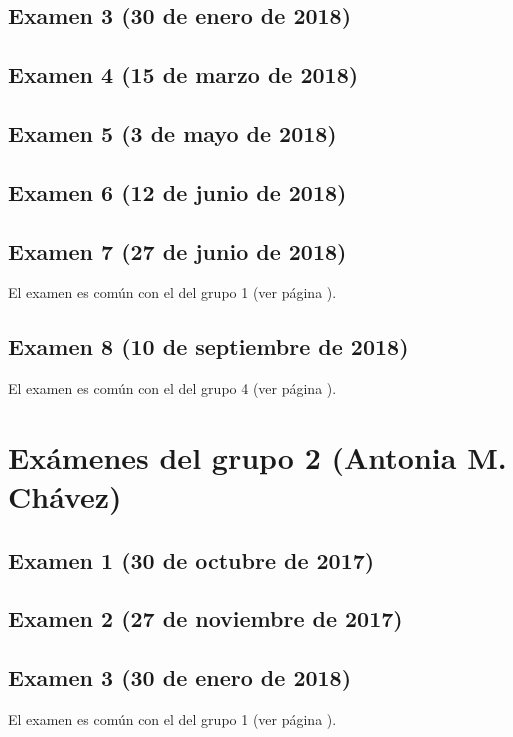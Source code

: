\documentclass[a4paper,12pt,twoside]{book}
\begin{document}
\subsection{Examen 3 (30 de enero de 2018)}
 \label{examen_17_18_1_3}
\subsection{Examen 4 (15 de marzo de 2018)}
\subsection{Examen 5 (3 de mayo de 2018)}
\subsection{Examen 6 (12 de junio de 2018)} \label{examen_17_18_1_6}
\subsection{Examen 7 (27 de junio de 2018)}
El examen es común con el del grupo 1 (ver página \pageref{examen_17_18_4_7}).
\subsection{Examen 8 (10 de septiembre de 2018)}
El examen es común con el del grupo 4 (ver página \pageref{examen_17_18_4_8}).

\section{Exámenes del grupo 2 (Antonia M. Chávez)}
\subsection{Examen 1 (30 de octubre de 2017)}
\subsection{Examen 2 (27 de noviembre de 2017)}
\subsection{Examen 3 (30 de enero de 2018)}
El examen es común con el del grupo 1 (ver página \pageref{examen_17_18_1_3}).
\end{document}
